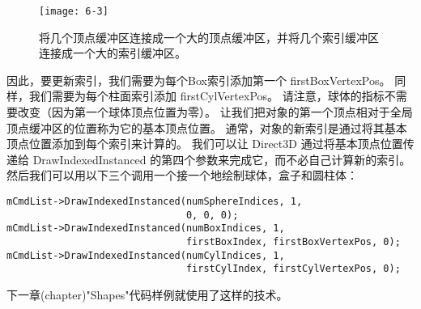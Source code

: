 \begin{flushleft}
\begin{figure}[h]
    \texttt{[image: 6-3]}
    \centering
    \caption{将几个顶点缓冲区连接成一个大的顶点缓冲区，并将几个索引缓冲区连接成一个大的索引缓冲区。}
    \label{fig:6-3}
\end{figure}

因此，要更新索引，我们需要为每个Box索引添加第一个 firstBoxVertexPos。 同样，我们需要为每个柱面索引添加 firstCylVertexPos。 请注意，球体的指标不需要改变（因为第一个球体顶点位置为零）。 让我们把对象的第一个顶点相对于全局顶点缓冲区的位置称为它的基本顶点位置。 通常，对象的新索引是通过将其基本顶点位置添加到每个索引来计算的。 我们可以让 Direct3D 通过将基本顶点位置传递给 DrawIndexedInstanced 的第四个参数来完成它，而不必自己计算新的索引。\\
然后我们可以用以下三个调用一个接一个地绘制球体，盒子和圆柱体：\\
\begin{lstlisting}
mCmdList->DrawIndexedInstanced(numSphereIndices, 1, 
                               0, 0, 0);
mCmdList->DrawIndexedInstanced(numBoxIndices, 1, 
                               firstBoxIndex, firstBoxVertexPos, 0);
mCmdList->DrawIndexedInstanced(numCylIndices, 1, 
                               firstCylIndex, firstCylVertexPos, 0);
\end{lstlisting}
下一章(chapter)"Shapes"代码样例就使用了这样的技术。
\end{flushleft}

\clearpage
